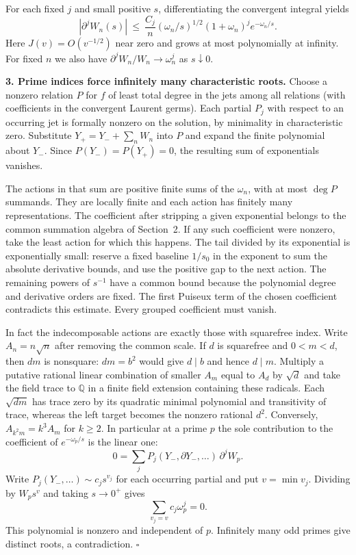 \documentclass[11pt]{article}
\newcommand{\pp}{\partial}
\newcommand{\head}[1]{\par\medskip\noindent\textbf{#1}\quad}
\begin{document}
For each fixed $j$ and small positive $s$, differentiating the convergent integral yields
\[
 |\pp^j W_n(s)|\ \leq\
 \frac{C_j}{n}(\omega_n/s)^{1/2}(1+\omega_n)^j e^{-\omega_n/s}.
\]
Here $J(v)=O(v^{-1/2})$ near zero and grows at most polynomially at infinity. For fixed $n$ we also have $\pp^jW_n/W_n\to\omega_n^j$ as $s\downarrow0$.

\head{3. Prime indices force infinitely many characteristic roots.}
Choose a nonzero relation $P$ for $f$ of least total degree in the jets among all relations (with coefficients in the convergent Laurent germs). Each partial $P_j$ with respect to an occurring jet is formally nonzero on the solution, by minimality in characteristic zero. Substitute $Y_+=Y_-+\sum_n W_n$ into $P$ and expand the finite polynomial about $Y_-$. Since $P(Y_-)=P(Y_+)=0$, the resulting sum of exponentials vanishes.

The actions in that sum are positive finite sums of the $\omega_n$, with at most $\deg P$ summands. They are locally finite and each action has finitely many representations. The coefficient after stripping a given exponential belongs to the common summation algebra of Section~2. If any such coefficient were nonzero, take the least action for which this happens. The tail divided by its exponential is exponentially small: reserve a fixed baseline $1/s_0$ in the exponent to sum the absolute derivative bounds, and use the positive gap to the next action. The remaining powers of $s^{-1}$ have a common bound because the polynomial degree and derivative orders are fixed. The first Puiseux term of the chosen coefficient contradicts this estimate. Every grouped coefficient must vanish.

In fact the indecomposable actions are exactly those with squarefree index. Write $A_n=n\sqrt n$ after removing the common scale. If $d$ is squarefree and $0<m<d$, then $dm$ is nonsquare: $dm=b^2$ would give $d\mid b$ and hence $d\mid m$. Multiply a putative rational linear combination of smaller $A_m$ equal to $A_d$ by $\sqrt d$ and take the field trace to $\mathbb Q$ in a finite field extension containing these radicals. Each $\sqrt{dm}$ has trace zero by its quadratic minimal polynomial and transitivity of trace, whereas the left target becomes the nonzero rational $d^2$. Conversely, $A_{k^2m}=k^3 A_m$ for $k\ge2$. In particular at a prime $p$ the sole contribution to the coefficient of $e^{-\omega_p/s}$ is the linear one:
\[
 0=\sum_j P_j(Y_-,\pp Y_-,\ldots)\,\pp^j W_p .
\]
Write $P_j(Y_-,\ldots)\sim c_j s^{v_j}$ for each occurring partial and put $v=\min v_j$. Dividing by $W_p s^v$ and taking $s\to0^+$ gives
\[
                   \sum_{v_j=v}c_j\omega_p^j=0.
\]
This polynomial is nonzero and independent of $p$. Infinitely many odd primes give distinct roots, a contradiction. \hfill$\square$
\end{document}
